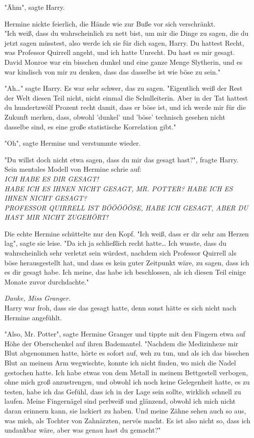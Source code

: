 {"Ähm", sagte Harry.

Hermine nickte feierlich, die Hände wie zur Buße vor sich verschränkt.\\ "Ich weiß, dass du wahrscheinlich zu nett bist, um mir die Dinge zu sagen, die du jetzt sagen müsstest, also werde ich sie für dich sagen, Harry. Du hattest Recht, was Professor Quirrell angeht, und ich hatte Unrecht. Du hast es mir gesagt. David Monroe war ein bisschen dunkel und eine ganze Menge Slytherin, und es war kindisch von mir zu denken, dass das dasselbe ist wie böse zu sein."

"Ah…" sagte Harry. Es war sehr schwer, das zu sagen. "Eigentlich weiß der Rest der Welt diesen Teil nicht, nicht einmal die Schulleiterin. Aber in der Tat hattest du hundertzwölf Prozent recht damit, dass er böse ist, und ich werde mir für die Zukunft merken, dass, obwohl 'dunkel' und 'böse' technisch gesehen nicht dasselbe sind, es eine große statistische Korrelation gibt."

"Oh", sagte Hermine und verstummte wieder.

"Du willst doch nicht etwa sagen, dass du mir das gesagt hast?", fragte Harry.\\ Sein mentales Modell von Hermine schrie auf:\\ \emph{ICH HABE ES DIR GESAGT!}\\ \emph{HABE ICH ES IHNEN NICHT GESAGT, MR. POTTER? HABE ICH ES IHNEN NICHT GESAGT?}\\ \emph{PROFESSOR QUIRRELL IST BÖÖÖÖÖSE, HABE ICH GESAGT, ABER DU HAST MIR NICHT ZUGEHÖRT!}

Die echte Hermine schüttelte nur den Kopf. "Ich weiß, dass er dir sehr am Herzen lag", sagte sie leise. "Da ich ja schließlich recht hatte… Ich wusste, dass du wahrscheinlich sehr verletzt sein würdest, nachdem sich Professor Quirrell als böse herausgestellt hat, und dass es kein guter Zeitpunkt wäre, zu sagen, dass ich es dir gesagt habe. Ich meine, das habe ich beschlossen, als ich diesen Teil einige Monate zuvor durchdachte."

\emph{Danke, Miss Granger.}\\ Harry war froh, dass sie das gesagt hatte, denn sonst hätte es sich nicht nach Hermine angefühlt.

"Also, Mr. Potter", sagte Hermine Granger und tippte mit den Fingern etwa auf Höhe der Oberschenkel auf ihren Bademantel. "Nachdem die Medizinhexe mir Blut abgenommen hatte, hörte es sofort auf, weh zu tun, und als ich das bisschen Blut an meinem Arm wegwischte, konnte ich nicht finden, wo mich die Nadel gestochen hatte. Ich habe etwas von dem Metall in meinem Bettgestell verbogen, ohne mich groß anzustrengen, und obwohl ich noch keine Gelegenheit hatte, es zu testen, habe ich das Gefühl, dass ich in der Lage sein sollte, wirklich schnell zu laufen. Meine Fingernägel sind perlweiß und glänzend, obwohl ich mich nicht daran erinnern kann, sie lackiert zu haben. Und meine Zähne sehen auch so aus, was mich, als Tochter von Zahnärzten, nervös macht. Es ist also nicht so, dass ich undankbar wäre, aber was genau hast du gemacht?"

}
